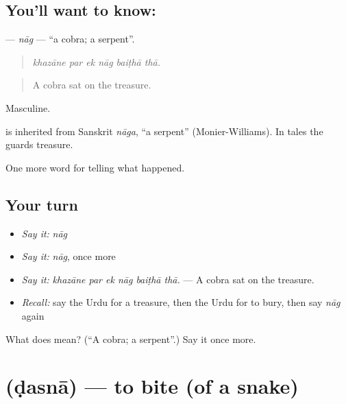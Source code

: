 \subsection*{You'll want to know: }
\textbf{} — \emph{nāg} — \textquotedblleft{}a cobra; a serpent\textquotedblright{}.

\begin{quote}
     
\end{quote}

\begin{quote}
\emph{khazāne par ek nāg baiṭhā thā.}
\end{quote}

\begin{quote}
A cobra sat on the treasure.
\end{quote}

Masculine.

\begin{cousinweb}
is inherited from Sanskrit \emph{nāga}, \textquotedblleft{}a serpent\textquotedblright{} (Monier-Williams). In tales the \textbf{} guards treasure.
\end{cousinweb}

\begin{grammarlens}[title={What you've built}]
One more word for telling what happened.
\end{grammarlens}

\subsection*{Your turn}
\begin{itemize}
\raggedright
  \item \emph{Say it:} \emph{nāg}
  \item \emph{Say it:} \emph{nāg}, once more
  \item \emph{Say it:} \emph{khazāne par ek nāg baiṭhā thā.} — A cobra sat on the treasure.
  \item \emph{Recall:} say the Urdu for a treasure, then the Urdu for to bury, then say \emph{nāg} again
\end{itemize}

\begin{tcolorbox}[breakable,colback=teal!4,colframe=teal!35!black,title={Before you move on}]
What does  mean? (\textquotedblleft{}A cobra; a serpent\textquotedblright{}.) Say it once more.
\end{tcolorbox}
\section[\texorpdfstring{\ur{ڈسنا} (ḍasnā)}{ڈسنا (ḍasnā)}]{ (ḍasnā) — to bite (of a snake)}

